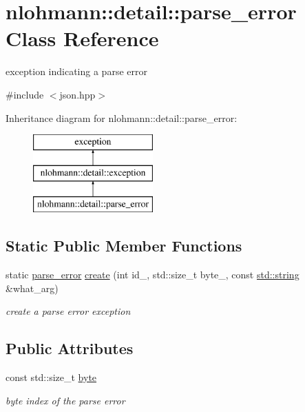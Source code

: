 \hypertarget{classnlohmann_1_1detail_1_1parse__error}{}\section{nlohmann\+:\+:detail\+:\+:parse\+\_\+error Class Reference}
\label{classnlohmann_1_1detail_1_1parse__error}


exception indicating a parse error  




{\ttfamily \#include $<$json.\+hpp$>$}

Inheritance diagram for nlohmann\+:\+:detail\+:\+:parse\+\_\+error\+:\begin{figure}[H]
\begin{center}
\leavevmode
\includegraphics[height=3.000000cm]{classnlohmann_1_1detail_1_1parse__error}
\end{center}
\end{figure}
\subsection*{Static Public Member Functions}
\begin{DoxyCompactItemize}
\item 
static \hyperlink{classnlohmann_1_1detail_1_1parse__error}{parse\+\_\+error} \hyperlink{classnlohmann_1_1detail_1_1parse__error_a9fd60ad6bce80fd99686ad332faefd37}{create} (int id\+\_\+, std\+::size\+\_\+t byte\+\_\+, const \hyperlink{namespacenlohmann_1_1detail_a90aa5ef615aa8305e9ea20d8a947980fab45cffe084dd3d20d928bee85e7b0f21}{std\+::string} \&what\+\_\+arg)
\begin{DoxyCompactList}\small\item\em create a parse error exception \end{DoxyCompactList}\end{DoxyCompactItemize}
\subsection*{Public Attributes}
\begin{DoxyCompactItemize}
\item 
const std\+::size\+\_\+t \hyperlink{classnlohmann_1_1detail_1_1parse__error_a9505aaa1ca943be927eec7cc579592ff}{byte}
\begin{DoxyCompactList}\small\item\em byte index of the parse error \end{DoxyCompactList}\end{DoxyCompactItemize}
